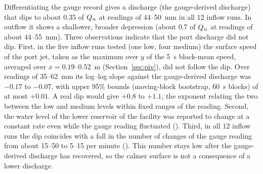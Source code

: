 
\begin{en}[M3-2]
Differentiating the gauge record gives a discharge (the gauge-derived discharge) that dips to about 0.35 of $Q_{\mathit{n}}$ at readings of 44--50~mm in all 12 inflow runs. In outflow it shows a shallower, broader depression (about 0.7 of $Q_{\mathit{n}}$ at readings of about 44--55~mm). Three observations indicate that the port discharge did not dip. First, in the five inflow runs tested (one low, four medium) the surface speed of the port jet, taken as the maximum over $y$ of the 5~s block-mean speed, averaged over $x = 0.19$--0.52~m (Section~\ref{sec:piv}), did not follow the dip. Over readings of 35--62~mm its log--log slope against the gauge-derived discharge was $-0.17$ to $-0.07$, with upper 95\% bounds (moving-block bootstrap, 60~s blocks) of at most $+0.01$. A real dip would give $+0.8$ to $+1.1$, the exponent relating the two between the low and medium levels within fixed ranges of the reading. Second, the water level of the lower reservoir of the facility was reported to change at a constant rate even while the gauge reading fluctuated (). Third, in all 12 inflow runs the dip coincides with a fall in the number of changes of the gauge reading from about 15--50 to 5--15 per minute (). This number stays low after the gauge-derived discharge has recovered, so the calmer surface is not a consequence of a lower discharge.
\end{en}
